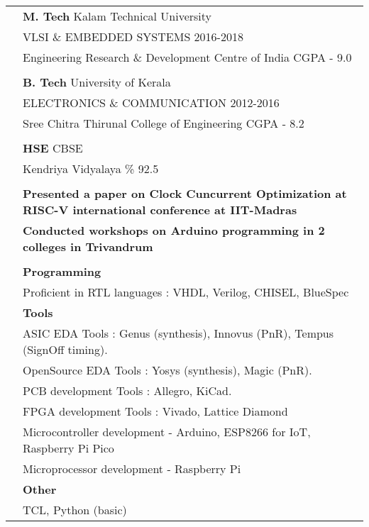 \documentclass[letterpaper, 11pt]{article}
\begin{document}
\begin{longtable}{p{1.3in}p{4.8in}}
\color{OliveGreen}{Education} 
& \textbf{M. Tech} \hfill Kalam Technical University \\ 
& VLSI \& EMBEDDED SYSTEMS \hfill 2016-2018 \\
& Engineering Research \& Development Centre of India \hfill CGPA -  9.0 \\
& \\

& \textbf{B. Tech} \hfill University of Kerala \\ 
& ELECTRONICS \& COMMUNICATION \hfill 2012-2016 \\
& Sree Chitra Thirunal College of Engineering \hfill CGPA -  8.2 \\
& \\

& \textbf{HSE} \hfill CBSE \\ 
& Kendriya Vidyalaya \hfill \% 92.5 \\
& \\




\nohyphens{\color{OliveGreen}{Presentations \& Workshops}} 
& \textbf{Presented a paper on Clock Cuncurrent Optimization at RISC-V international conference
at IIT-Madras} \\
& \textbf{Conducted workshops on Arduino programming in 2 colleges in Trivandrum} \\
& \\

{\color{OliveGreen}{Skills}} 
& \textbf{Programming}\\
& Proficient in RTL languages : VHDL, Verilog, CHISEL, BlueSpec \\
& \textbf{Tools}\\
& ASIC EDA Tools : Genus (synthesis), Innovus (PnR), Tempus (SignOff timing).\\
& OpenSource EDA Tools : Yosys (synthesis), Magic (PnR).\\
& PCB development Tools : Allegro, KiCad. \\
& FPGA development Tools : Vivado, Lattice Diamond\\
& Microcontroller development - Arduino, ESP8266 for IoT, Raspberry Pi Pico \\
& Microprocessor development - Raspberry Pi \\
& \textbf{Other} \\
& TCL, Python (basic) \\


\end{longtable}
\end{document}
